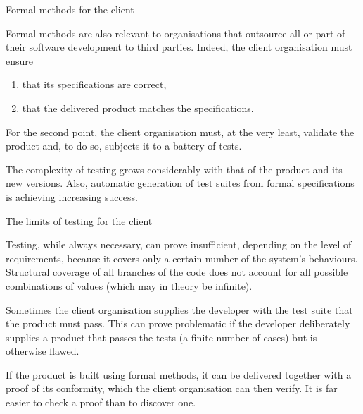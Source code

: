\documentclass[compress,dvips,xcolor={dvipsnames},t]{beamer}
\begin{document}
%
\begin{frame}{Formal methods for the client}

  Formal methods are also relevant to organisations that outsource all
  or part of their software development to third parties. Indeed, the
  client organisation must ensure
  \begin{enumerate}

    \item that its specifications are correct,

    \item that the delivered product matches the specifications.

  \end{enumerate}

  \medskip

  For the second point, the client organisation must, at the very
  least, validate the product and, to do so, subjects it to a battery
  of tests.

  \bigskip

  The complexity of testing grows considerably with that of the
  product and its new versions. Also, automatic generation of test
  suites from formal specifications is achieving increasing success.

\end{frame}

%
\begin{frame}{The limits of testing for the client}

  Testing, while always necessary, can prove insufficient,
  depending on the level of requirements, because it covers only a
  certain number of the system's behaviours. Structural coverage of
  all branches of the code does not account for all possible
  combinations of values (which may in theory be infinite).

  \bigskip

  Sometimes the client organisation supplies the developer with the
  test suite that the product must pass. This can prove problematic if
  the developer deliberately supplies a product that passes the tests
  (a finite number of cases) but is otherwise flawed.

  \bigskip

  If the product is built using formal methods, it can be delivered
  together with a proof of its conformity, which the client
  organisation can then verify. It is far easier to check a proof than
  to discover one.

\end{frame}
\end{document}
